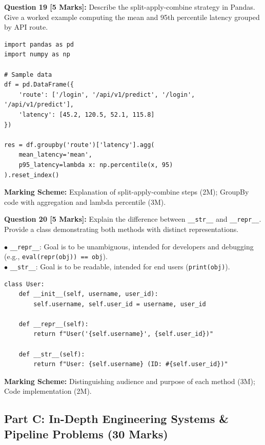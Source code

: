 \noindent\textbf{Question 19 [5 Marks]:} Describe the split-apply-combine strategy in Pandas. Give a worked example computing the mean and 95th percentile latency grouped by API route.
\begin{solutionbox}
\begin{lstlisting}
import pandas as pd
import numpy as np

# Sample data
df = pd.DataFrame({
    'route': ['/login', '/api/v1/predict', '/login', '/api/v1/predict'],
    'latency': [45.2, 120.5, 52.1, 115.8]
})

res = df.groupby('route')['latency'].agg(
    mean_latency='mean',
    p95_latency=lambda x: np.percentile(x, 95)
).reset_index()
\end{lstlisting}
\end{solutionbox}
\begin{markingrubric}
\textbf{Marking Scheme:} Explanation of split-apply-combine steps (2M); GroupBy code with aggregation and lambda percentile (3M).
\end{markingrubric}

\noindent\textbf{Question 20 [5 Marks]:} Explain the difference between \texttt{\_\_str\_\_} and \texttt{\_\_repr\_\_}. Provide a class demonstrating both methods with distinct representations.
\begin{solutionbox}
$\bullet$ \texttt{\_\_repr\_\_}: Goal is to be unambiguous, intended for developers and debugging (e.g., \texttt{eval(repr(obj)) == obj}).\\
$\bullet$ \texttt{\_\_str\_\_}: Goal is to be readable, intended for end users (\texttt{print(obj)}).
\begin{lstlisting}
class User:
    def __init__(self, username, user_id):
        self.username, self.user_id = username, user_id

    def __repr__(self):
        return f"User('{self.username}', {self.user_id})"

    def __str__(self):
        return f"User: {self.username} (ID: #{self.user_id})"
\end{lstlisting}
\end{solutionbox}
\begin{markingrubric}
\textbf{Marking Scheme:} Distinguishing audience and purpose of each method (3M); Code implementation (2M).
\end{markingrubric}

\subsection*{Part C: In-Depth Engineering Systems \& Pipeline Problems (30 Marks)}

